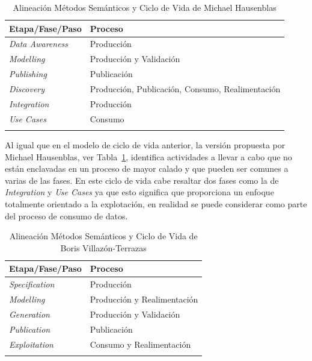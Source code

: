 \begin{longtable}[c]{|p{6cm}|p{8cm}|} 

\hline

  \textbf{Etapa/Fase/Paso} &  \textbf{Proceso} \\\hline

\endhead
\textit{Data Awareness} & Producción \\ \hline
\textit{Modelling} & Producción y Validación \\ \hline
\textit{Publishing} & Publicación \\ \hline
\textit{Discovery} & Producción, Publicación, Consumo, Realimentación \\ \hline
\textit{Integration} & Producción \\ \hline
\textit{Use Cases} & Consumo  \\ \hline
\hline
\caption{Alineación Métodos Semánticos y Ciclo de Vida de Michael Hausenblas}  \label{tabla:metodos-hausenblas}\\    
\end{longtable}

Al igual que en el modelo de ciclo de vida anterior, la versión propuesta por Michael Hausenblas, ver Tabla~\ref{tabla:metodos-hausenblas}, identifica actividades
a llevar a cabo que no están enclavadas en un proceso de mayor calado y que pueden ser comunes a varias de las
fases. En este ciclo de vida cabe resaltar dos fases como la de \textit{Integration} y \textit{Use Cases} ya que
esto significa que proporciona un enfoque totalmente orientado a la explotación, en realidad se puede considerar como 
parte del proceso de consumo de datos.

\begin{longtable}[c]{|p{6cm}|p{8cm}|} 

\hline

  \textbf{Etapa/Fase/Paso} &  \textbf{Proceso} \\\hline

\endhead
\textit{Specification} & Producción \\ \hline
\textit{Modelling} & Producción y Realimentación \\ \hline
\textit{Generation} & Producción y Validación \\ \hline
\textit{Publication} & Publicación \\ \hline
\textit{Exploitation} & Consumo y Realimentación \\ \hline
\hline
\caption{Alineación Métodos Semánticos y Ciclo de Vida de Boris Villazón-Terrazas}  \label{tabla:metodos-boris}\\    
\end{longtable}

